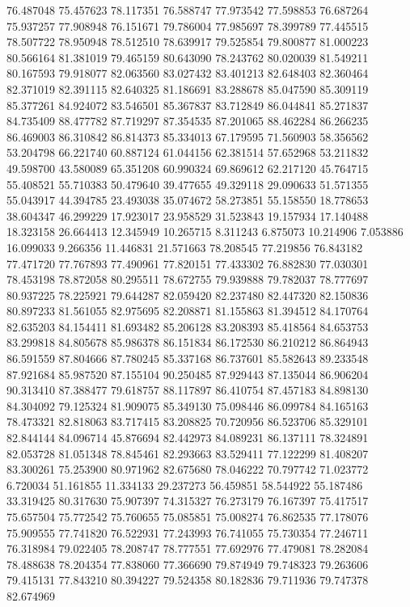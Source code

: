 76.487048
75.457623
78.117351
76.588747
77.973542
77.598853
76.687264
75.937257
77.908948
76.151671
79.786004
77.985697
78.399789
77.445515
78.507722
78.950948
78.512510
78.639917
79.525854
79.800877
81.000223
80.566164
81.381019
79.465159
80.643090
78.243762
80.020039
81.549211
80.167593
79.918077
82.063560
83.027432
83.401213
82.648403
82.360464
82.371019
82.391115
82.640325
81.186691
83.288678
85.047590
85.309119
85.377261
84.924072
83.546501
85.367837
83.712849
86.044841
85.271837
84.735409
88.477782
87.719297
87.354535
87.201065
88.462284
86.266235
86.469003
86.310842
86.814373
85.334013
67.179595
71.560903
58.356562
53.204798
66.221740
60.887124
61.044156
62.381514
57.652968
53.211832
49.598700
43.580089
65.351208
60.990324
69.869612
62.217120
45.764715
55.408521
55.710383
50.479640
39.477655
49.329118
29.090633
51.571355
55.043917
44.394785
23.493038
35.074672
58.273851
55.158550
18.778653
38.604347
46.299229
17.923017
23.958529
31.523843
19.157934
17.140488
18.323158
26.664413
12.345949
10.265715
8.311243
6.875073
10.214906
7.053886
16.099033
9.266356
11.446831
21.571663
78.208545
77.219856
76.843182
77.471720
77.767893
77.490961
77.820151
77.433302
76.882830
77.030301
78.453198
78.872058
80.295511
78.672755
79.939888
79.782037
78.777697
80.937225
78.225921
79.644287
82.059420
82.237480
82.447320
82.150836
80.897233
81.561055
82.975695
82.208871
81.155863
81.394512
84.170764
82.635203
84.154411
81.693482
85.206128
83.208393
85.418564
84.653753
83.299818
84.805678
85.986378
86.151834
86.172530
86.210212
86.864943
86.591559
87.804666
87.780245
85.337168
86.737601
85.582643
89.233548
87.921684
85.987520
87.155104
90.250485
87.929443
87.135044
86.906204
90.313410
87.388477
79.618757
88.117897
86.410754
87.457183
84.898130
84.304092
79.125324
81.909075
85.349130
75.098446
86.099784
84.165163
78.473321
82.818063
83.717415
83.208825
70.720956
86.523706
85.329101
82.844144
84.096714
45.876694
82.442973
84.089231
86.137111
78.324891
82.053728
81.051348
78.845461
82.293663
83.529411
77.122299
81.408207
83.300261
75.253900
80.971962
82.675680
78.046222
70.797742
71.023772
6.720034
51.161855
11.334133
29.237273
56.459851
58.544922
55.187486
33.319425
80.317630
75.907397
74.315327
76.273179
76.167397
75.417517
75.657504
75.772542
75.760655
75.085851
75.008274
76.862535
77.178076
75.909555
77.741820
76.522931
77.243993
76.741055
75.730354
77.246711
76.318984
79.022405
78.208747
78.777551
77.692976
77.479081
78.282084
78.488638
78.204354
77.838060
77.366690
79.874949
79.748323
79.263606
79.415131
77.843210
80.394227
79.524358
80.182836
79.711936
79.747378
82.674969
